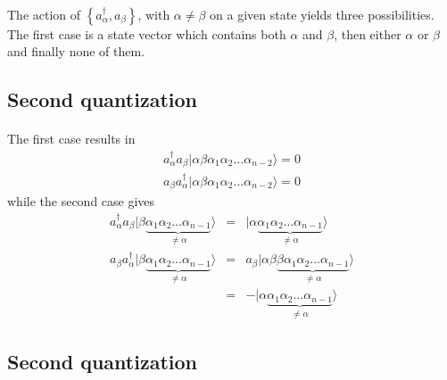 \documentclass[%
twoside,                 %
final,                   %
10pt]{article}
\begin{document}
\paragraph{}
The action of $\left\{a_\alpha^{\dagger}, a_\beta\right\}$, with 
$\alpha \ne \beta$ on a given state yields three possibilities. 
The first case is a state vector which contains both $\alpha$ and $\beta$, then either 
$\alpha$ or $\beta$ and finally none of them.




\subsection{Second quantization}

\paragraph{}
The first case results in
\begin{eqnarray}
	a_\alpha^{\dagger} a_\beta |\alpha\beta\alpha_1\alpha_2 \dots \alpha_{n-2}\rangle = 0 \nonumber \\
	a_\beta a_\alpha^{\dagger} |\alpha\beta\alpha_1\alpha_2 \dots \alpha_{n-2}\rangle = 0 \label{eq:2-18a}
\end{eqnarray}
while the second case gives
\begin{eqnarray}
	 a_\alpha^{\dagger} a_\beta |\beta \underbrace{\alpha_1\alpha_2 \dots \alpha_{n-1}}_{\neq \alpha}\rangle &=& 
	 	|\alpha \underbrace{\alpha_1\alpha_2 \dots \alpha_{n-1}}_{\neq  \alpha}\rangle \nonumber \\
	a_\beta a_\alpha^{\dagger} |\beta \underbrace{\alpha_1\alpha_2 \dots \alpha_{n-1}}_{\neq \alpha}\rangle &=&
		a_\beta |\alpha\beta\underbrace{\beta \alpha_1\alpha_2 \dots \alpha_{n-1}}_{\neq \alpha}\rangle \nonumber \\
	&=& - |\alpha\underbrace{\alpha_1\alpha_2 \dots \alpha_{n-1}}_{\neq \alpha}\rangle \label{eq:2-18b}
\end{eqnarray}




\subsection{Second quantization}

\end{document}
